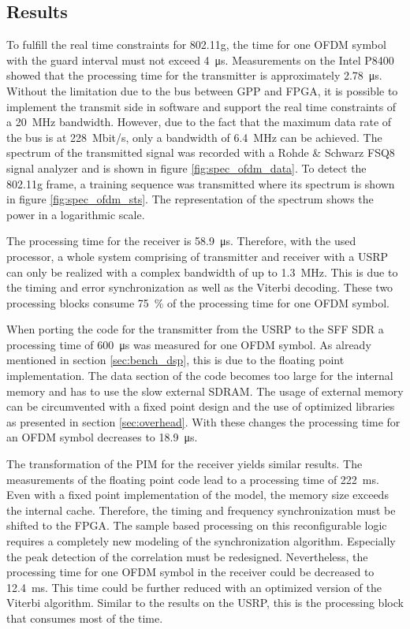\subsection{Results}
To fulfill the real time constraints for 802.11g, the time for one OFDM symbol with the guard interval must not exceed \SI{4}{\micro s}. Measurements on the Intel P8400 showed that the processing time for the transmitter is approximately \SI{2.78}{\micro s}. Without the limitation due to the bus between GPP and FPGA, it is possible to implement the transmit side in software and support the real time constraints of a \SI{20}{MHz} bandwidth. However, due to the fact that the maximum data rate of the bus is at \SI{228}{Mbit/s}, only a bandwidth of \SI{6.4}{MHz} can be achieved. The spectrum of the transmitted signal was recorded with a Rohde \& Schwarz FSQ8 signal analyzer and is shown in figure \ref{fig:spec_ofdm_data}. To detect the 802.11g frame, a training sequence was transmitted where its spectrum is shown in figure \ref{fig:spec_ofdm_sts}. The representation of the spectrum shows the power in a logarithmic scale.

The processing time for the receiver is \SI{58.9}{\micro s}. Therefore, with the used processor, a whole system comprising of transmitter and receiver with a USRP can only be realized with a complex bandwidth of up to \SI{1.3}{MHz}. This is due to the timing and error synchronization as well as the Viterbi decoding. These two processing blocks consume \SI{75}{\%} of the processing time for one OFDM symbol.

When porting the code for the transmitter from the USRP to the SFF SDR a processing time of \SI{600}{\micro s} was measured for one OFDM symbol. As already mentioned in section \ref{sec:bench_dsp}, this is due to the floating point implementation. The data section of the code becomes too large for the internal memory and has to use the slow external SDRAM. The usage of external memory can be circumvented with a fixed point design and the use of optimized libraries as presented in section \ref{sec:overhead}. With these changes the processing time for an OFDM symbol decreases to \SI{18.9}{\micro s}.

The transformation of the \ac{PIM} for the receiver yields similar results. The measurements of the floating point code lead to a processing time of \SI{222}{ms}. Even with a fixed point implementation of the model, the memory size exceeds the internal cache. Therefore, the timing and frequency synchronization must be shifted to the FPGA. The sample based processing on this reconfigurable logic requires a completely new modeling of the synchronization algorithm. Especially the peak detection of the correlation must be redesigned. Nevertheless, the processing time for one OFDM symbol in the receiver could be decreased to \SI{12.4}{ms}. This time could be further reduced with an optimized version of the Viterbi algorithm. Similar to the results on the USRP, this is the processing block that consumes most of the time.

